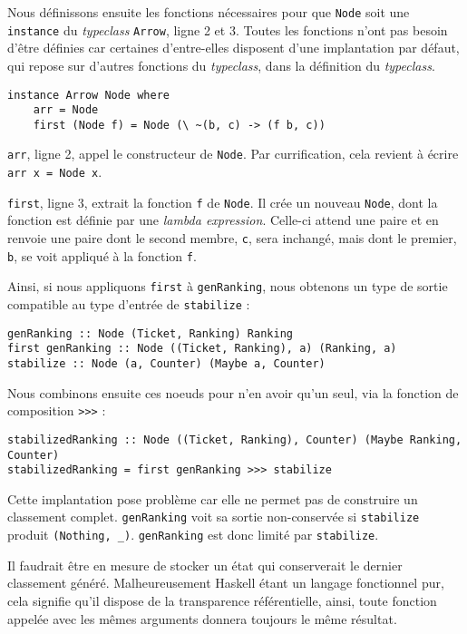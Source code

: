 \documentclass{llncs}
\newcommand{\Arrv}{\lstinline{Arrow}, }
\begin{document}
Nous définissons ensuite les fonctions nécessaires pour que \lstinline{Node} soit
une \lstinline{instance} du \emph{typeclass} \Arrv ligne 2 et 3.
Toutes les fonctions n'ont pas besoin d'être définies car certaines d'entre-elles
disposent d'une implantation par défaut, qui repose sur d'autres fonctions du
\emph{typeclass}, dans la définition du \emph{typeclass}.

\begin{lstlisting}
instance Arrow Node where
    arr = Node
    first (Node f) = Node (\ ~(b, c) -> (f b, c))
\end{lstlisting}

\lstinline{arr}, ligne 2, appel le constructeur de \lstinline{Node}.
Par currification, cela revient à écrire \lstinline{arr x = Node x}.

\lstinline{first}, ligne 3, extrait la fonction \lstinline{f} de \lstinline{Node}.
Il crée un nouveau \lstinline{Node}, dont la fonction est définie par
une \emph{lambda expression}.
Celle-ci attend une paire et en renvoie une paire dont le second membre, \lstinline{c},
sera inchangé, mais dont le premier, \lstinline{b}, se voit appliqué à la fonction \lstinline{f}.

Ainsi, si nous appliquons \lstinline{first} à \lstinline{genRanking}, nous obtenons
un type de sortie compatible au type d'entrée de \lstinline{stabilize} :
\begin{lstlisting}
genRanking :: Node (Ticket, Ranking) Ranking
first genRanking :: Node ((Ticket, Ranking), a) (Ranking, a)
stabilize :: Node (a, Counter) (Maybe a, Counter)
\end{lstlisting}

Nous combinons ensuite ces noeuds pour n'en avoir qu'un seul, via la fonction
de composition \lstinline{>>>} :
\begin{lstlisting}
stabilizedRanking :: Node ((Ticket, Ranking), Counter) (Maybe Ranking, Counter)
stabilizedRanking = first genRanking >>> stabilize
\end{lstlisting}

Cette implantation pose problème car elle ne permet pas de construire un classement
complet. \lstinline{genRanking} voit sa sortie non-conservée si \lstinline{stabilize}
produit \lstinline{(Nothing, _)}.
\lstinline{genRanking} est donc limité par \lstinline{stabilize}.

Il faudrait être en mesure de stocker un état qui conserverait le dernier classement
généré.
Malheureusement Haskell étant un langage fonctionnel pur, cela signifie qu'il dispose
de la transparence référentielle, ainsi, toute fonction appelée avec les mêmes arguments
donnera toujours le même résultat.
\end{document}
